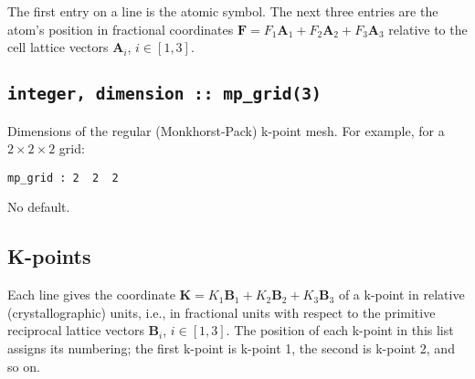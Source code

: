 The first entry on a line is the atomic symbol. The next three entries
are the atom's position in fractional coordinates $\mathbf{F} = F_1
\mathbf{A}_{1} + F_2 \mathbf{A}_{2} + F_3 \mathbf{A}_{3}$
relative to the cell lattice vectors $\mathbf{A}_i$, $i\in [1,3]$. 


\subsection[mp\_grid]{\tt integer, dimension :: mp\_grid(3)}
Dimensions of the regular (Monkhorst-Pack) k-point mesh. For example,
for a $2\times2\times2$ grid:

\verb#mp_grid : 2  2  2#

No default.


%
%
%
%
%

%


\subsection[Kpoints]{K-points}
Each line gives the coordinate $\mathbf{K}=K_1 \mathbf{B}_{1} + K_2
\mathbf{B}_{2} + K_3 \mathbf{B}_3$ of a k-point
in relative (crystallographic) units, i.e., in fractional units with
respect to the primitive reciprocal lattice vectors $\mathbf{B}_{i}$,
$i \in [1,3]$. The position  of each
k-point in this list assigns its numbering; the first k-point is
k-point 1, the second is k-point 2, and so on.


